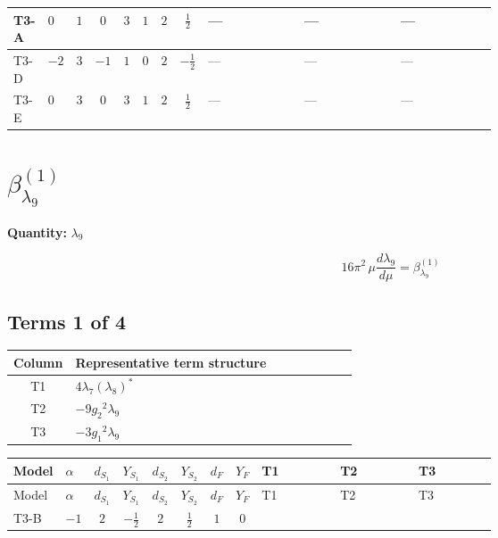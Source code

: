 \documentclass[8pt]{article}
\begin{document}
\begin{landscape}
\begin{longtable}{@{}llcccccc >{\raggedright\arraybackslash}p{0.21\linewidth} >{\raggedright\arraybackslash}p{0.21\linewidth} >{\raggedright\arraybackslash}p{0.21\linewidth}@{}}
\midrule
T3-A & $0$ & $1$ & $0$ & $3$ & $1$ & $2$ & $\frac{1}{2}$ & --- & --- & --- \\
\midrule
T3-D & $-2$ & $3$ & $-1$ & $1$ & $0$ & $2$ & $-\frac{1}{2}$ & --- & --- & --- \\
\midrule
T3-E & $0$ & $3$ & $0$ & $3$ & $1$ & $2$ & $\frac{1}{2}$ & --- & --- & --- \\
\midrule
\bottomrule
\end{longtable}
\clearpage
\section*{$\beta_{\lambda_{9}}^{(1)}$}
\noindent\textbf{Quantity: }$\lambda_{9}$\par\smallskip
\[16\pi^2\,\mu\frac{d \lambda_{9}}{d\mu}=\beta_{\lambda_{9}}^{(1)}\]
\subsection*{Terms 1 of 4}
\begin{center}
\begin{tabular}{@{}c >{\raggedright\arraybackslash}p{0.82\linewidth}@{}}
\toprule
Column & Representative term structure \\
\midrule
T1 & \(\displaystyle 4 {\lambda_7} \left({\lambda_8}\right)^{*}\) \\
\midrule
T2 & \(\displaystyle -9 {g_2}^2 {\lambda_9}\) \\
\midrule
T3 & \(\displaystyle -3 {g_1}^2 {\lambda_9}\) \\
\midrule
\bottomrule
\end{tabular}
\end{center}
\smallskip
\tiny
\begin{longtable}{@{}llcccccc >{\raggedright\arraybackslash}p{0.21\linewidth} >{\raggedright\arraybackslash}p{0.21\linewidth} >{\raggedright\arraybackslash}p{0.21\linewidth}@{}}
\toprule
Model & $\alpha$ & $d_{S_1}$ & $Y_{S_1}$ & $d_{S_2}$ & $Y_{S_2}$ & $d_F$ & $Y_F$ & T1 & T2 & T3 \\
\midrule
\endfirsthead
\toprule
Model & $\alpha$ & $d_{S_1}$ & $Y_{S_1}$ & $d_{S_2}$ & $Y_{S_2}$ & $d_F$ & $Y_F$ & T1 & T2 & T3 \\
\midrule
\endhead
T3-B & $-1$ & $2$ & $-\frac{1}{2}$ & $2$ & $\frac{1}{2}$ & $1$ & $0$ & \scriptsize\adjustbox{max width=\linewidth}{$\begin{gathered} 4 {\lambda_7} \left({\lambda_8}\right)^{*}\end{gathered}$} & \scriptsize\adjustbox{max width=\linewidth}{$\begin{gathered} -9 {g_2}^2 {\lambda_9}\end{gathered}$} & \scriptsize\adjustbox{max width=\linewidth}{$\begin{gathered} -3 {g_1}^2 {\lambda_9}\end{gathered}$} \\

\end{longtable}
\end{landscape}
\end{document}

